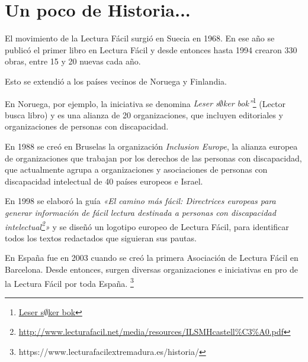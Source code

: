 \section{Un poco de Historia...}
El movimiento de la Lectura Fácil surgió en Suecia en 1968. En ese año se publicó el primer libro en Lectura Fácil y desde entonces hasta 1994 crearon 330 obras, entre 15 y 20 nuevas cada año.

Esto se extendió a los países vecinos de Noruega y Finlandia.

En Noruega, por ejemplo, la iniciativa se denomina \textit{Leser s$\emptyset$ker bok”}\footnote{\href{https://lesersokerbok.no/english/}{Leser s$\emptyset$ker bok}} (Lector busca libro) y es una alianza de 20 organizaciones, que incluyen editoriales y organizaciones de personas con discapacidad.

En 1988 se creó en Bruselas la organización \textit{Inclusion Europe}, la alianza europea de organizaciones que trabajan por los derechos de las personas con discapacidad, que actualmente agrupa a organizaciones y asociaciones de personas con discapacidad intelectual de 40 países europeos e Israel.

En 1998 se elaboró la guía \textit{«El camino más fácil: Directrices europeas para generar información de fácil lectura destinada a personas con discapacidad intelectual\footnote{\href{http://www.lecturafacil.net/media/resources/ILSMHcastell\%C3\%A0.pdf}{http://www.lecturafacil.net/media/resources/ILSMHcastell\%C3\%A0.pdf}}»} y se diseñó un logotipo europeo de Lectura Fácil, para identificar todos los textos redactados que siguieran sus pautas.

En España fue en 2003 cuando se creó la primera Asociación de Lectura Fácil en Barcelona. Desde entonces, surgen diversas organizaciones e iniciativas en pro de la Lectura Fácil por toda España.
\footnote{https://www.lecturafacilextremadura.es/historia/}

